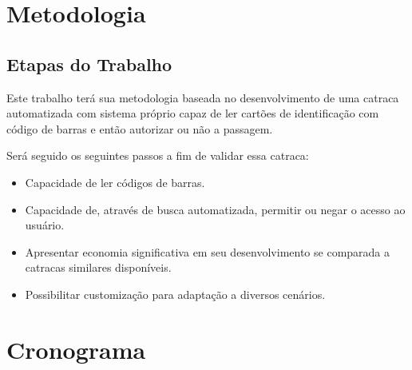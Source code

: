 \section{Metodologia}
\subsection{Etapas do Trabalho}
Este trabalho terá sua metodologia baseada no desenvolvimento de uma catraca automatizada com sistema próprio capaz de ler cartões de identificação com código de barras e então autorizar ou não a passagem.

Será seguido os seguintes passos a fim de validar essa catraca:
\begin{itemize}
    \item Capacidade de ler códigos de barras.
    \item Capacidade de, através de busca automatizada, permitir ou negar o acesso ao usuário.
    \item Apresentar economia significativa em seu desenvolvimento se comparada a catracas similares disponíveis. 
    \item Possibilitar customização para adaptação a diversos cenários.
\end{itemize}

\section{Cronograma}

